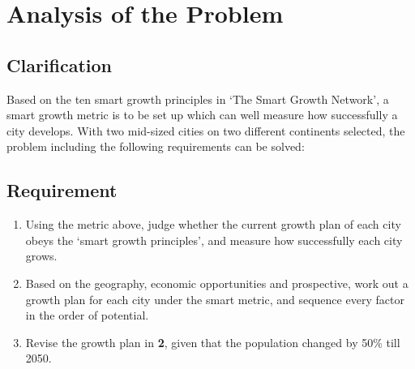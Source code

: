 \section{Analysis of the Problem}
\subsection{Clarification}
Based on the ten smart growth principles in `The Smart Growth Network'\cite{pdf:smart-growth}, a  smart growth metric is to be set up which can well measure how successfully a city develops.
With two mid-sized cities on two different continents selected, the problem including the following requirements can be solved:

\subsection{Requirement}
\begin{enumerate}
  \item Using the metric above, judge whether the current growth plan of each city obeys the `smart growth principles', and measure how successfully each city grows.
  \item Based on the geography, economic opportunities and prospective, work out a growth plan for each city under the smart metric, and sequence every factor in the order of potential.
  \item Revise the growth plan in \textbf{2}, given that the population changed by 50\% till 2050.
\end{enumerate}


